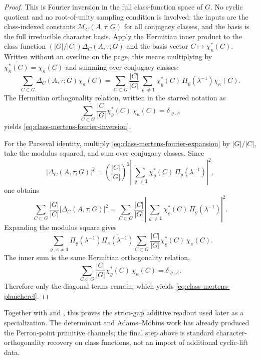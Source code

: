 \begin{proof}
  This is Fourier inversion in the full class-function space of \(G\).
  No cyclic quotient and no root-of-unity sampling condition is involved:
  the inputs are the class-indexed constants
  \(\mathcal M_C(A,\tau;G)\) for all conjugacy classes, and the basis is
  the full irreducible character basis.
  Apply the Hermitian inner product to the class function
  \((|G|/|C|)\Delta_C(A,\tau;G)\) and the basis vector
  \(C\mapsto\chi_\kappa^\ast(C)\).  Written without an overline on the
  page, this means multiplying by
  \(\overline{\chi_\kappa^\ast(C)}=\chi_\kappa(C)\) and summing over
  conjugacy classes:
  \[
    \sum_{C\subset G}\Delta_C(A,\tau;G)\chi_\kappa(C)
    =
    \sum_{C\subset G}\frac{|C|}{|G|}
      \sum_{\varrho\neq\mathbf 1}
        \chi_\varrho^\ast(C)\,
        \Pi_\varrho(\lambda^{-1})\chi_\kappa(C).
  \]
  The Hermitian orthogonality relation, written in the starred notation as
  \[
    \sum_{C\subset G}\frac{|C|}{|G|}
      \chi_\varrho^\ast(C)\,\chi_\kappa(C)
    =\delta_{\varrho,\kappa}
  \]
  yields \eqref{eq:class-mertens-fourier-inversion}.

  For the Parseval identity, multiply
  \eqref{eq:class-mertens-fourier-expansion} by \(|G|/|C|\), take the
  modulus squared, and sum over conjugacy classes. Since
  \[
    |\Delta_C(A,\tau;G)|^2
    =
    \left(\frac{|C|}{|G|}\right)^2
    \left|\sum_{\varrho\neq\mathbf 1}
      \chi_\varrho^\ast(C)\,
      \Pi_\varrho(\lambda^{-1})\right|^2,
  \]
  one obtains
  \[
    \sum_{C\subset G}\frac{|G|}{|C|}|\Delta_C(A,\tau;G)|^2
    =
    \sum_{C\subset G}\frac{|C|}{|G|}
      \left|\sum_{\varrho\neq\mathbf 1}
        \chi_\varrho^\ast(C)\,
        \Pi_\varrho(\lambda^{-1})\right|^2.
  \]
  Expanding the modulus square gives
  \[
    \sum_{\varrho,\kappa\neq\mathbf 1}
      \Pi_\varrho(\lambda^{-1})
      \overline{\Pi_\kappa(\lambda^{-1})}
      \sum_{C\subset G}\frac{|C|}{|G|}
        \chi_\varrho^\ast(C)\,\chi_\kappa(C).
  \]
  The inner sum is the same Hermitian orthogonality relation,
  \[
    \sum_{C\subset G}\frac{|C|}{|G|}
      \chi_\varrho^\ast(C)\,\chi_\kappa(C)
    =\delta_{\varrho,\kappa}.
  \]
  Therefore only the diagonal terms remain, which
  yields \eqref{eq:class-mertens-plancherel}.
\end{proof}

\noindent
Together with  and
, this proves the strict-gap additive
readout used later as a specialization. The determinant and Adams--M\"obius
work has already produced the Perron-point primitive channels; the final step
above is standard character-orthogonality recovery on class functions, not an
import of additional cyclic-lift data.

